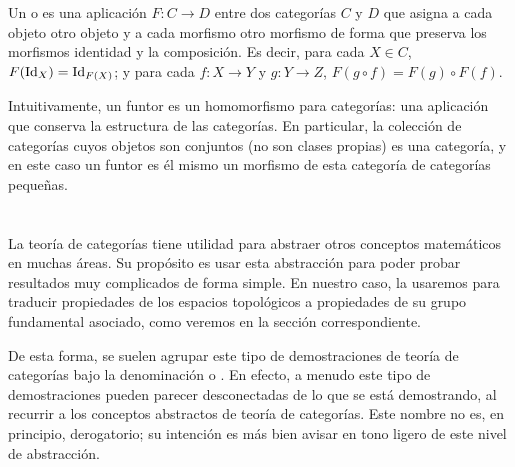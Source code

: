 \begin{defi}[Funtor]
\label{funt_defi_funtor}

Un  o  es una aplicación $F:C\to D$ entre dos categorías $C$ y $D$ que asigna a cada objeto otro objeto y a cada morfismo otro morfismo de forma que preserva los morfismos identidad y la composición. Es decir, para cada $X\in C$, $F(\operatorname{Id}_X)=\operatorname{Id}_{F(X)}$; y para cada $f:X\to Y$ y $g:Y\to Z$, $F(g\circ f)=F(g)\circ F(f)$.
\end{defi}

\begin{obs}
Intuitivamente, un funtor es un homomorfismo para categorías: una aplicación que conserva la estructura de las categorías. En particular, la colección de categorías cuyos objetos son conjuntos (no son clases propias) es una categoría, y en este caso un funtor es él mismo un morfismo de esta categoría de categorías pequeñas.
\end{obs}

\section{}

La teoría de categorías tiene utilidad para abstraer otros conceptos matemáticos en muchas áreas. Su propósito es usar esta abstracción para poder probar resultados muy complicados de forma simple. En nuestro caso, la usaremos para traducir propiedades de los espacios topológicos a propiedades de su grupo fundamental asociado, como veremos en la sección correspondiente.

De esta forma, se suelen agrupar este tipo de demostraciones de teoría de categorías bajo la denominación  o . En efecto, a menudo este tipo de demostraciones pueden parecer desconectadas de lo que se está demostrando, al recurrir a los conceptos abstractos de teoría de categorías. Este nombre no es, en principio, derogatorio; su intención es más bien avisar en tono ligero de este nivel de abstracción.
